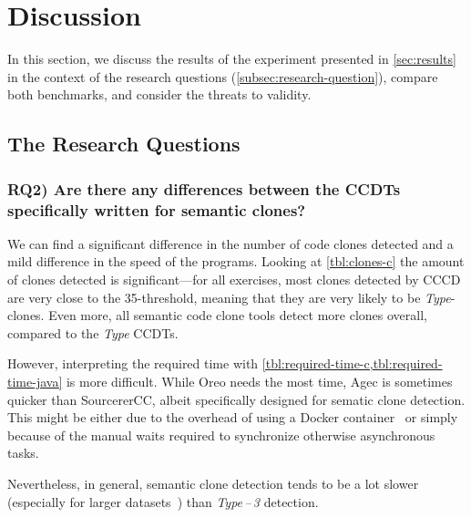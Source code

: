 \documentclass[10pt,journal,compsoc]{IEEEtran}
\def\T#1{\textsl{Type\nobreakdash-#1}}
\begin{document}
\section{Discussion}\label{sec:discussion}
In this section, we discuss the results of the experiment presented in \cref{sec:results} in the context of the research questions (\cref{subsec:research-question}), compare both benchmarks, and consider the threats to validity.

\subsection{The Research Questions}

\subsubsection{RQ2) Are there any differences between the CCDTs specifically written for semantic clones?}
We can find a significant difference in the number of code clones detected and a mild difference in the speed of the programs.
Looking at \cref{tbl:clones-c} the amount of clones detected is significant---for all exercises, most clones detected by CCCD are very close to the \num{35}-threshold, meaning that they are very likely to be \T4-clones.
Even more, all semantic code clone tools detect more clones overall, compared to the \T3 CCDTs.

However, interpreting the required time with \cref{tbl:required-time-c,tbl:required-time-java} is more difficult.
While Oreo needs the most time, Agec is sometimes quicker than SourcererCC, albeit specifically designed for sematic clone detection.
This might be either due to the overhead of using a Docker container~\cite{li2017performance} or
simply because of the manual waits required to synchronize otherwise asynchronous tasks.

Nevertheless, in general, semantic clone detection tends to be a lot slower (especially for larger datasets~\cite{SourcererCC}) than \T{1\,--\,3} detection.
\end{document}
